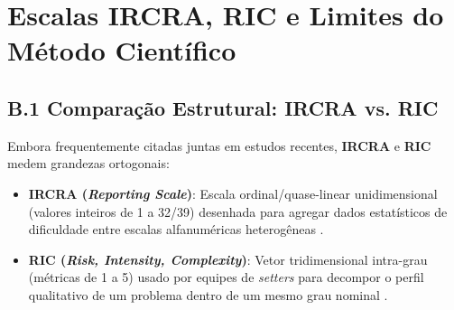 \section{Escalas IRCRA, RIC e Limites do Método Científico}

\subsection*{B.1 Comparação Estrutural: IRCRA vs. RIC}
Embora frequentemente citadas juntas em estudos recentes, \textbf{IRCRA} e \textbf{RIC} medem grandezas ortogonais:
\begin{itemize}
    \item \textbf{IRCRA (\textit{Reporting Scale})}: Escala ordinal/quase-linear unidimensional (valores inteiros de 1 a 32/39) desenhada para agregar dados estatísticos de dificuldade entre escalas alfanuméricas heterogêneas \cite{ircra_draper, pmc_ric_study}.
    \item \textbf{RIC (\textit{Risk, Intensity, Complexity})}: Vetor tridimensional intra-grau (métricas de 1 a 5) usado por equipes de \textit{setters} para decompor o perfil qualitativo de um problema dentro de um mesmo grau nominal \cite{pmc_ric_study, godoffe_routesetting}.
\end{itemize}


